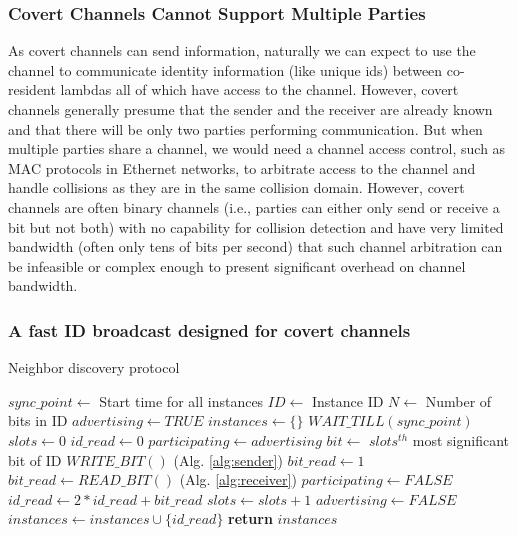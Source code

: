 \subsubsection{Covert Channels Cannot Support Multiple Parties}
As covert channels can send information, naturally we can expect to use the 
channel to communicate identity information (like unique ids) between 
co-resident lambdas all of which have access to the channel. However,
covert channels generally presume that the sender and the receiver are 
already known and that there will be only two parties performing 
communication. But when multiple parties share a channel, we would need 
a channel access control, such as MAC protocols in Ethernet networks, 
to arbitrate access to the channel and handle collisions as they 
are in the same collision domain. However, covert channels are often 
binary channels (i.e., parties can either only send or receive a bit 
but not both) with no capability for collision detection and have very 
limited bandwidth (often only tens of bits per second) that such 
channel arbitration can be infeasible or complex enough to present 
significant overhead on channel bandwidth. 



\subsubsection{A fast ID broadcast designed for covert channels}
\label{sec:method:protocol}


\begin{algorithm}[!t]
\caption{Neighbor discovery protocol}
\label{alg:protcol}
\begin{algorithmic}[1]
\STATE $sync\_point \leftarrow$ {Start time for all instances}
\STATE $ID \leftarrow$ {Instance ID}
\STATE $N \leftarrow$ {Number of bits in ID}
\STATE $advertising \leftarrow TRUE$
\STATE $instances \leftarrow \{\} $
\STATE $WAIT\_TILL(sync\_point)$
    \STATE $slots \leftarrow 0$
    \STATE $id\_read \leftarrow 0$
    \STATE $participating \leftarrow advertising$
        \STATE $bit \leftarrow$ {$slots^{th}$ most significant bit of ID}
            \STATE $WRITE\_BIT()$               (Alg. \ref{alg:sender})
            \STATE $bit\_read \leftarrow 1$
        \ELSE
            \STATE $bit\_read \leftarrow READ\_BIT()$       (Alg. \ref{alg:receiver})
                \STATE $participating \leftarrow FALSE$
            \ENDIF
        \ENDIF
        \STATE $id\_read \leftarrow 2 * id\_read + bit\_read$
        \STATE $slots \leftarrow slots + 1$
    \ENDWHILE
        \STATE $advertising \leftarrow FALSE$
    \ENDIF
    \STATE $instances \leftarrow instances \cup \{id\_read\}$
\ENDWHILE
\STATE \textbf{return} $instances$
\end{algorithmic}
\end{algorithm}

